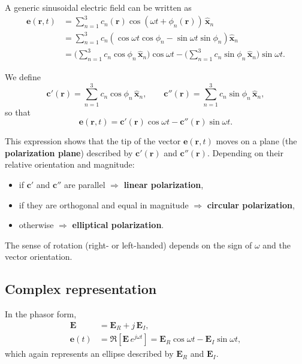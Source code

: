 A generic sinusoidal electric field can be written as
\begin{align}
    \mathbf{e}(\mathbf{r},t)
    &= \sum_{n=1}^{3} c_n(\mathbf{r})\cos(\omega t + \phi_n(\mathbf{r}))\,\hat{\mathbf{x}}_n\\
    &= \sum_{n=1}^{3} c_n\left(\cos\omega t \cos\phi_n - \sin\omega t \sin\phi_n\right)\hat{\mathbf{x}}_n\\
    &= \Bigg(\sum_{n=1}^{3} c_n\cos\phi_n\,\hat{\mathbf{x}}_n\Bigg)\cos\omega t
       -\Bigg(\sum_{n=1}^{3} c_n\sin\phi_n\,\hat{\mathbf{x}}_n\Bigg)\sin\omega t.
\end{align}

We define
\[
\mathbf{c}'(\mathbf{r}) = \sum_{n=1}^{3} c_n\cos\phi_n\,\hat{\mathbf{x}}_n, 
\qquad
\mathbf{c}''(\mathbf{r}) = \sum_{n=1}^{3} c_n\sin\phi_n\,\hat{\mathbf{x}}_n,
\]
so that
\begin{equation}
    \mathbf{e}(\mathbf{r},t)
    = \mathbf{c}'(\mathbf{r})\cos\omega t - \mathbf{c}''(\mathbf{r})\sin\omega t.
\end{equation}

This expression shows that the tip of the vector $\mathbf{e}(\mathbf{r},t)$
moves on a plane (the \textbf{polarization plane}) described by
$\mathbf{c}'(\mathbf{r})$ and $\mathbf{c}''(\mathbf{r})$.
Depending on their relative orientation and magnitude:
\begin{itemize}
    \item if $\mathbf{c}'$ and $\mathbf{c}''$ are parallel $\Rightarrow$ \textbf{linear polarization},
    \item if they are orthogonal and equal in magnitude $\Rightarrow$ \textbf{circular polarization},
    \item otherwise $\Rightarrow$ \textbf{elliptical polarization}.
\end{itemize}

The sense of rotation (right- or left-handed) depends on the sign of $\omega$ and the vector orientation.

\subsection*{Complex representation}

In the phasor form,
\begin{align}
    \mathbf{E} &= \mathbf{E}_R + j\,\mathbf{E}_I,\\
    \mathbf{e}(t) &= \Re\!\left[\mathbf{E}\,e^{j\omega t}\right]
    = \mathbf{E}_R\cos\omega t - \mathbf{E}_I\sin\omega t,
\end{align}
which again represents an ellipse described by $\mathbf{E}_R$ and $\mathbf{E}_I$.

